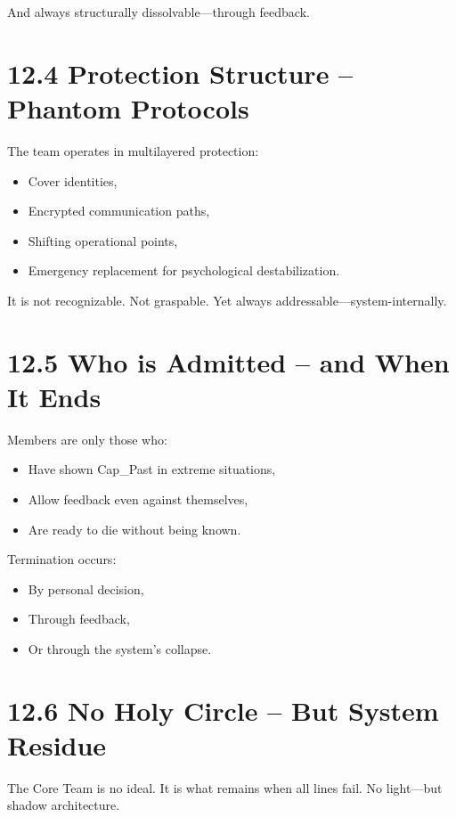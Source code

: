 \documentclass[12pt,a4paper]{book}
\begin{document}
And always structurally dissolvable—through feedback.

\section*{12.4 Protection Structure – Phantom Protocols}

The team operates in multilayered protection:

\begin{itemize}
    \item Cover identities,
    \item Encrypted communication paths,
    \item Shifting operational points,
    \item Emergency replacement for psychological destabilization.
\end{itemize}

It is not recognizable.  
Not graspable.  
Yet always addressable—system-internally.

\section*{12.5 Who is Admitted – and When It Ends}

Members are only those who:

\begin{itemize}
    \item Have shown Cap\_Past in extreme situations,
    \item Allow feedback even against themselves,
    \item Are ready to die without being known.
\end{itemize}

Termination occurs:

\begin{itemize}
    \item By personal decision,
    \item Through feedback,
    \item Or through the system’s collapse.
\end{itemize}

\section*{12.6 No Holy Circle – But System Residue}

The Core Team is no ideal.  
It is what remains when all lines fail.  
No light—but shadow architecture.
\end{document}
